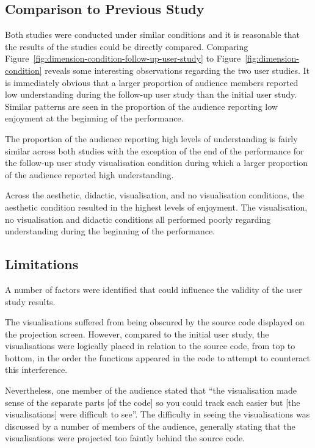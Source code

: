 \subsection{Comparison to Previous Study}

Both studies were conducted under similar conditions and it is reasonable that the results of the studies could be directly compared. Comparing Figure~\ref{fig:dimension-condition-follow-up-user-study} to Figure~\ref{fig:dimension-condition} reveals some interesting observations regarding the two user studies. It is immediately obvious that a larger proportion of audience members reported low understanding during the follow-up user study than the initial user study. Similar patterns are seen in the proportion of the audience reporting low enjoyment at the beginning of the performance.

The proportion of the audience reporting high levels of understanding is fairly similar across both studies with the exception of the end of the performance for the follow-up user study visualisation condition during which a larger proportion of the audience reported high understanding.

Across the aesthetic, didactic, visualisation, and no visualisation conditions, the aesthetic condition resulted in the highest levels of enjoyment. The visualisation, no visualisation and didactic conditions all performed poorly regarding understanding during the beginning of the performance.

\subsection{Limitations}

A number of factors were identified that could influence the validity of the user study results.

The visualisations suffered from being obscured by the source code displayed on the projection screen. However, compared to the initial user study, the visualisations were logically placed in relation to the source code, from top to bottom, in the order the functions appeared in the code to attempt to counteract this interference.

Nevertheless, one member of the audience stated that ``the visualisation made sense of the separate parts [of the code] so you could track each easier but [the visualisations] were difficult to see''. The difficulty in seeing the visualisations was discussed by a number of members of the audience, generally stating that the visualisations were projected too faintly behind the source code.

